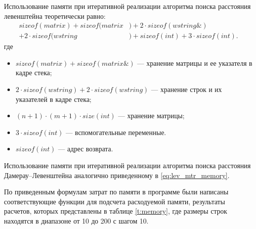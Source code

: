 Использование памяти при итеративной реализации алгоритма поиска расстояния левенштейна теоретически равно:
\begin{equation}
	\label{eq:lev_mtr_memory}
	\begin{aligned}
		sizeof(matrix) + sizeof(matrix&) + 2 \cdot sizeof(wstring\&)\\
        + 2 \cdot sizeof(wstring&) + sizeof(int) + 3 \cdot sizeof(int).
	\end{aligned}
\end{equation}
где 
\begin{itemize}
	\item $sizeof(matrix) + sizeof(matrix\&)$ --- хранение матрицы и ее указателя в кадре стека;
	\item $2 \cdot sizeof(wstring) + 2 \cdot sizeof(wstring)$ --- хранение строк и их указателей в кадре стека;
	\item $(n + 1) \cdot (m + 1) \cdot size(int)$ --- хранение матрицы;
	\item $3 \cdot sizeof(int)$ --- вспомогательные переменные.
	\item $sizeof(int)$ --- адрес возврата.
\end{itemize}

Использование памяти при итеративной реализации алгоритма поиска расстояния Дамерау--Левенштейна аналогично приведенному
в \ref{eq:lev_mtr_memory}.

По приведенным формулам затрат по памяти в программе были написаны соответствующие функции для подсчета расходуемой памяти, результаты расчетов, которых представлены в таблице \ref{t:memory}, где размеры строк находятся в диапазоне от 10 до 200 с шагом 10.

\clearpage

